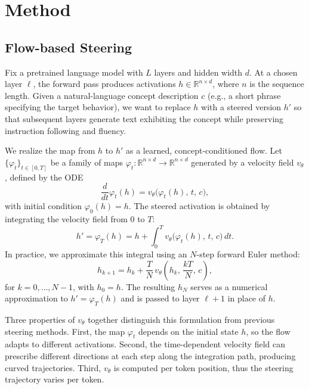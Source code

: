 \documentclass{article}
\newcommand{\R}{\mathbb{R}}
\newcommand{\vt}{v_\theta}
\begin{document}
\section{Method}
\label{sec:method}

\subsection{Flow-based Steering}
\label{sec:flow}

Fix a pretrained language model with $L$ layers and hidden width $d$. At a chosen layer $\ell$, the forward pass produces activations $h \in \R^{n \times d}$, where $n$ is the sequence length. Given a natural-language concept description $c$ (e.g., a short phrase specifying the target behavior), we want to replace $h$ with a steered version $h'$ so that subsequent layers generate text exhibiting the concept while preserving instruction following and fluency.

We realize the map from $h$ to $h'$ as a learned, concept-conditioned flow. Let $\{\varphi_t\}_{t \in [0, T]}$ be a family of maps $\varphi_t : \R^{n \times d} \to \R^{n \times d}$ generated by a velocity field $\vt$, defined by the ODE
\begin{equation}
\label{eq:flow}
\frac{d}{dt}\varphi_t(h) = \vt\bigl(\varphi_t(h),\, t,\, c\bigr),
\end{equation}
with initial condition $\varphi_0(h) = h$. The steered activation is obtained by integrating the velocity field from $0$ to $T$:
\begin{equation}
\label{eq:integral}
h' = \varphi_T(h) = h + \int_0^T \vt\bigl(\varphi_t(h),\, t,\, c\bigr)\, dt.
\end{equation}
In practice, we approximate this integral using an $N$-step forward Euler method:
\begin{equation}
\label{eq:euler}
h_{k+1} = h_k + \frac{T}{N}\, \vt\!\left(h_k,\, \frac{kT}{N},\, c\right),
\end{equation}
for $k = 0, \ldots, N-1$, with $h_0 = h$. The resulting $h_N$ serves as a numerical approximation to $h' = \varphi_T(h)$ and is passed to layer $\ell+1$ in place of $h$.

Three properties of $\vt$ together distinguish this formulation from previous steering methods. First, the map $\varphi_t$ depends on the initial state $h$, so the flow adapts to different activations. Second, the time-dependent velocity field can prescribe different directions at each step along the integration path, producing curved trajectories. Third, $\vt$ is computed per token position, thus the steering trajectory varies per token.
\end{document}
